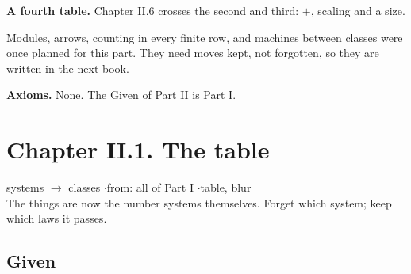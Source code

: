 \textbf{A fourth table.} Chapter II.6 crosses the second and third: $+$, scaling and a size.

\begin{center}
\end{center}

Modules, arrows, counting in every finite row, and machines between classes were once planned for this part. They need moves kept, not forgotten, so they are written in the next book.

\textbf{Axioms.} None. The Given of Part II is Part I.

\newpage

\section*{Chapter II.1. The table}
\begin{center}
{\normalsize systems $\to$ classes \quad$\cdot$\quad from: all of Part I \quad$\cdot$\quad table, blur}\\[4pt]
{\small The things are now the number systems themselves. Forget which system; keep which laws it passes.}
\end{center}

\subsection*{Given}

